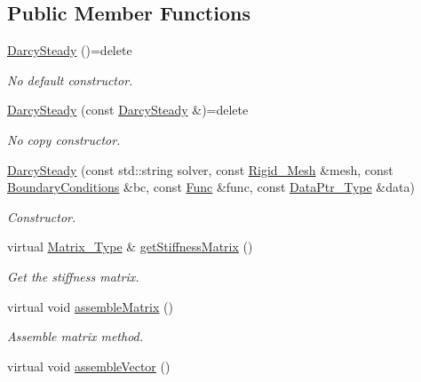 \subsection*{Public Member Functions}
\begin{DoxyCompactItemize}
\item 
\hyperlink{classFVCode3D_1_1DarcySteady_ac483d4725a121bc6c6b48d159358d7bc}{Darcy\+Steady} ()=delete
\begin{DoxyCompactList}\small\item\em No default constructor. \end{DoxyCompactList}\item 
\hyperlink{classFVCode3D_1_1DarcySteady_a9a0957e0dc0ccec40c7cf24698343a4f}{Darcy\+Steady} (const \hyperlink{classFVCode3D_1_1DarcySteady}{Darcy\+Steady} \&)=delete
\begin{DoxyCompactList}\small\item\em No copy constructor. \end{DoxyCompactList}\item 
\hyperlink{classFVCode3D_1_1DarcySteady_ad62eb3f00ffd84247f1efabc4bc44c54}{Darcy\+Steady} (const std\+::string solver, const \hyperlink{classFVCode3D_1_1Rigid__Mesh}{Rigid\+\_\+\+Mesh} \&mesh, const \hyperlink{classFVCode3D_1_1BoundaryConditions}{Boundary\+Conditions} \&bc, const \hyperlink{namespaceFVCode3D_a38fa3b2520ad364d2c3d56ea5077826a}{Func} \&func, const \hyperlink{namespaceFVCode3D_a3d19a370a98afe491a9e17a646a9c56f}{Data\+Ptr\+\_\+\+Type} \&data)
\begin{DoxyCompactList}\small\item\em Constructor. \end{DoxyCompactList}\item 
virtual \hyperlink{classFVCode3D_1_1DarcySteady_aa06573b2c5767486a09fb33c4b0cb480}{Matrix\+\_\+\+Type} \& \hyperlink{classFVCode3D_1_1DarcySteady_a2709d24b9841b8f227b5b7c1417505df}{get\+Stiffness\+Matrix} ()
\begin{DoxyCompactList}\small\item\em Get the stiffness matrix. \end{DoxyCompactList}\item 
virtual void \hyperlink{classFVCode3D_1_1DarcySteady_af48f96919f23df0f0708c8692da14bbd}{assemble\+Matrix} ()
\begin{DoxyCompactList}\small\item\em Assemble matrix method. \end{DoxyCompactList}\item 
virtual void \hyperlink{classFVCode3D_1_1DarcySteady_a811dc61fdc4bc731bc1790461e0538cb}{assemble\+Vector} ()

\end{DoxyCompactItemize}
